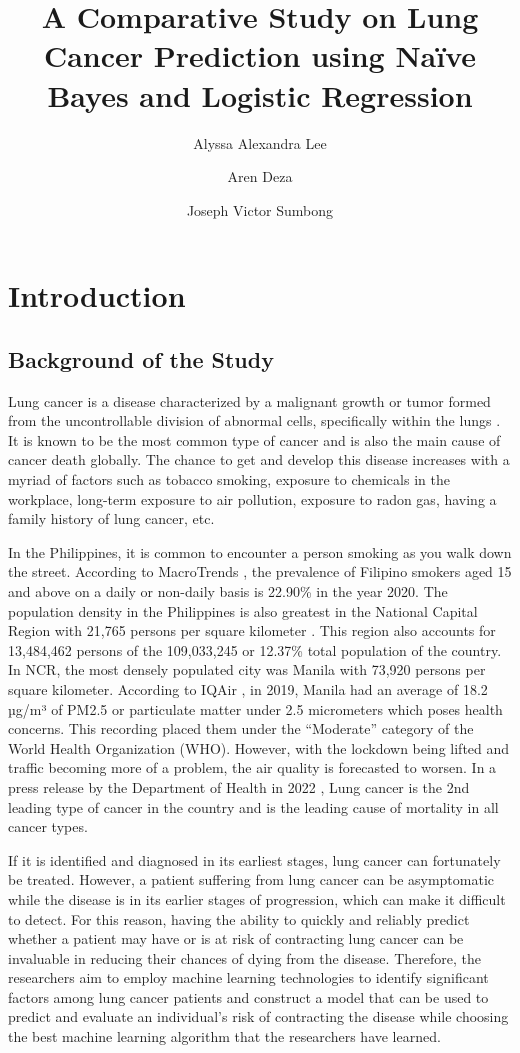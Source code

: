 \documentclass[runningheads]{llncs}
\title{\textbf{\LARGE A Comparative Study on Lung Cancer Prediction using Naïve Bayes and Logistic Regression}}
\author{Alyssa Alexandra Lee\inst{1}\and Aren Deza\inst{1}\and Joseph Victor Sumbong\inst{1}}
\institute{University of The Philippines Visayas, Miag-ao, Iloilo City}
\begin{document}
\maketitle


\section{Introduction}

\subsection{Background of the Study}
Lung cancer is a disease characterized by a malignant growth or tumor formed from the uncontrollable division of abnormal cells, specifically within the lungs \cite{cancerResearchUK2019}. It is known to be the most common type of cancer and is also the main cause of cancer death globally. The chance to get and develop this disease increases with a myriad of factors such as tobacco smoking, exposure to chemicals in the workplace, long-term exposure to air pollution, exposure to radon gas, having a family history of lung cancer, etc.

In the Philippines, it is common to encounter a person smoking as you walk down the street. According to MacroTrends \cite{macrotrends2022}, the prevalence of Filipino smokers aged 15 and above on a daily or non-daily basis is 22.90\% in the year 2020. The population density in the Philippines is also greatest in the National Capital Region with 21,765 persons per square kilometer \cite{philippinestatisticsauthority2021}. This region also accounts for 13,484,462 persons of the 109,033,245 or 12.37\% total population of the country. In NCR, the most densely populated city was Manila with 73,920 persons per square kilometer. According to IQAir \cite{IQAir2022}, in 2019, Manila had an average of 18.2 µg/m³ of PM2.5 or particulate matter under 2.5 micrometers which poses health concerns. This recording placed them under the “Moderate” category of the World Health Organization (WHO). However, with the lockdown being lifted and traffic becoming more of a problem, the air quality is forecasted to worsen. In a press release by the  Department of Health in 2022 \cite{doh2021}, Lung cancer is the 2nd leading type of cancer in the country and is the leading cause of mortality in all cancer types. 

If it is identified and diagnosed in its earliest stages, lung cancer can fortunately be treated. However, a patient suffering from lung cancer can be asymptomatic while the disease is in its earlier stages of progression, which can make it difficult to detect. For this reason, having the ability to quickly and reliably predict whether a patient may have or is at risk of contracting lung cancer can be invaluable in reducing their chances of dying from the disease. 
Therefore, the researchers aim to employ machine learning technologies to identify significant factors among lung cancer patients and construct a model that can be used to predict and evaluate an individual's risk of contracting the disease while choosing the best machine learning algorithm that the researchers have learned. 
\end{document}
